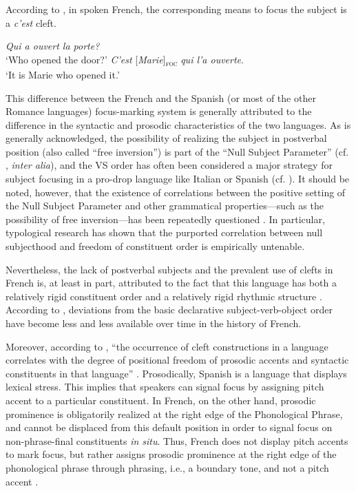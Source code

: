 According to \textcite{lambrecht1996information}, in spoken French, the corresponding means to focus the subject is a \textit{c'est} cleft. 

 \ea \label{ex527}
\ea \textit{Qui a ouvert la porte?}\\
 ‘Who opened the door?'
\ex \textit{C'est}  {[\textit{Marie}]\textsubscript{\textsc{foc}}} \normalsize \textit{qui l'a ouverte}.\\
`It is Marie who opened it.'
\z \z 

This difference between the French and the Spanish (or most of the other Romance languages) focus-marking system is generally attributed to the difference in the syntactic and prosodic characteristics of the two languages. As is generally acknowledged, the possibility of realizing the subject in postverbal position (also called ``free inversion”) is part of the ``Null Subject Parameter” (cf. \cite{rizzi1982issues, biberauer2009parametric}, \textit{inter alia}), and the VS order has often been considered a major strategy for subject focusing in a pro-drop language  like  Italian or Spanish (cf. \cite{belletti2008answering}). It should be noted, however, that the existence of correlations between the positive setting of the Null Subject Parameter and other grammatical properties—such as the possibility of free inversion—has been repeatedly questioned \parencite{Newmeyer2005}. In particular, typological research \parencite{Gilligan1987} has shown that the purported correlation between null subjecthood and freedom of constituent order is empirically untenable.

Nevertheless, the lack of postverbal subjects and the prevalent use of clefts in French is, at least in part, attributed to the fact that this language has both a relatively rigid constituent order and a relatively rigid rhythmic structure \parencite{dufter2003rhythmic}.
According to \textcite{dufter201614}, deviations from the basic declarative subject-verb-object order have become less and less available over time in the history of French.

Moreover, according to \textcite{lambrecht2001framework}, ``the occurrence of cleft constructions in a language correlates with the degree of positional freedom of prosodic accents and syntactic constituents in that language” \parencite[488]{lambrecht2001framework}. 
Prosodically, Spanish is a language that displays lexical stress. This implies that speakers can signal focus by assigning pitch accent to a particular constituent. In French, on the other hand, prosodic  prominence   is  obligatorily realized at the right edge of the Phonological Phrase, and cannot be displaced from this default position in order to signal focus on non-phrase-final constituents \textit{in situ}. Thus, French does not display pitch accents to mark focus, but rather assigns prosodic prominence at the right edge of the phonological phrase through phrasing, i.e., a boundary tone, and not a pitch accent \parencite{fery2001focus}.

